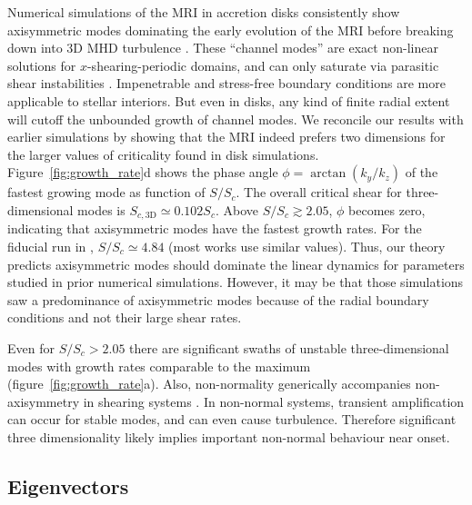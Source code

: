 \documentclass{rsproca_new}%
\newcommand{\SSC}{S/S_{c}}
\begin{document}
Numerical simulations of the MRI in accretion disks consistently show axisymmetric modes dominating the early evolution of the MRI before breaking down into 3D MHD turbulence \cite{1995ApJ...440..742H,2018ApJ...853..174H,2019ApJS..241...26D}. 
These ``channel modes'' are exact non-linear solutions for $x$-shearing-periodic domains, and can only saturate via parasitic shear instabilities \cite{1994ApJ...432..213G}.
Impenetrable and stress-free boundary conditions are more applicable to stellar interiors. 
But even in disks, any kind of finite radial extent will cutoff the unbounded growth of channel modes. 
We reconcile our results with earlier simulations by showing that the MRI indeed prefers two dimensions for the larger values of criticality found in disk simulations. 
Figure~\ref{fig:growth_rate}d shows the phase angle $\phi=\arctan(k_{y}/k_{z})$ of the fastest growing mode as function of $\SSC$.
The overall critical shear for three-dimensional modes is $S_{c,\text{3D}}\simeq0.102S_c$.
Above $\SSC\gtrsim2.05$, $\phi$ becomes zero, indicating that axisymmetric modes have the fastest growth rates.
For the fiducial run in \cite{1996ApJ...464..690H}, $\SSC\simeq4.84$ (most works use similar values).
Thus, our theory predicts axisymmetric modes should dominate the linear dynamics for parameters studied in prior numerical simulations.
However, it may be that those simulations saw a predominance of axisymmetric modes because of the radial boundary conditions and not their large shear rates.

Even for $\SSC> 2.05$ there are significant swaths of unstable three-dimensional modes with growth rates comparable to the maximum (figure~\ref{fig:growth_rate}a).
Also, non-normality generically accompanies non-axisymmetry in shearing systems \cite{1992MNRAS.255P..25K}.
In non-normal systems, transient amplification can occur for stable modes, and can even cause turbulence.
Therefore significant three dimensionality likely implies important non-normal behaviour near onset.

\subsection{Eigenvectors}
\label{sec:eigenvectors}
\end{document}
